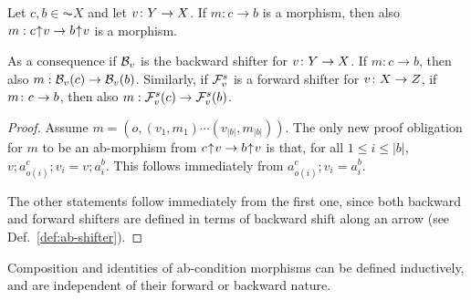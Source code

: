 \begin{lemma}
Let $c,b \in  \AC{X}$ and let $v\colon Y\rightarrow X$. If $m:c\to b$ is a morphism, then also $m:{c}{\mskip1mu\uparrow\mskip1mu}{v}\rightarrow {b}{\mskip1mu\uparrow\mskip1mu}{v}$ is a morphism.

As a consequence if $\mathcal{B}_v$ is the backward shifter for $v\colon Y\rightarrow X$. If $m:c\to b$, then also $m:\mathcal{B}_v(c)\rightarrow\mathcal{B}_v(b)$. 
Similarly, if $\mathcal{F}^s_v$ is a forward shifter for $v\colon X\rightarrow Z$, if $m\colon c\rightarrow b$, then also $m:\mathcal{F}^s_v(c)\rightarrow\mathcal{F}^s_v(b)$. 

\end{lemma}
%
\begin{fullorname}
\begin{proof}
Assume $m = (o,(v_1,m_1)\cdots(v_{|b|},m_{|b|}))$. The only new proof obligation for $m$ to be an ab-morphism from ${c}{\mskip1mu\uparrow\mskip1mu}{v}\rightarrow {b}{\mskip1mu\uparrow\mskip1mu}{v}$ is that, for all $1\leq i\leq |b|$, $v;a^c_{o(i)};v_i=v;a^b_i$. This follows immediately from $a^c_{o(i)};v_i=a^b_i$. 

The other statements follow immediately from the first one, since both backward and forward shifters are defined in terms of backward shift along an arrow (see Def.~\ref{def:ab-shifter}).
\end{proof}
\end{fullorname}
%
%


Composition and identities of ab-condition morphisms can be defined inductively, and are independent of their forward or backward nature.  

